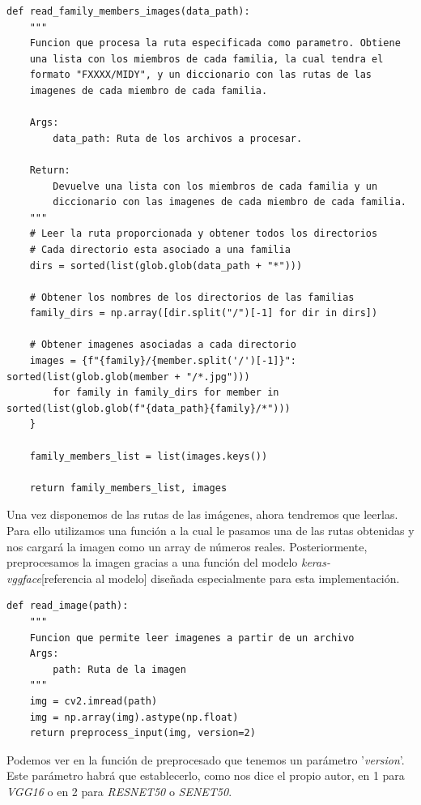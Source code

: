 \documentclass[11pt,a4paper]{article}
\begin{document}
\begin{lstlisting}
def read_family_members_images(data_path):
    """
    Funcion que procesa la ruta especificada como parametro. Obtiene
    una lista con los miembros de cada familia, la cual tendra el
    formato "FXXXX/MIDY", y un diccionario con las rutas de las
    imagenes de cada miembro de cada familia.

    Args:
        data_path: Ruta de los archivos a procesar.
    
    Return:
        Devuelve una lista con los miembros de cada familia y un
        diccionario con las imagenes de cada miembro de cada familia.
    """
    # Leer la ruta proporcionada y obtener todos los directorios
    # Cada directorio esta asociado a una familia
    dirs = sorted(list(glob.glob(data_path + "*")))

    # Obtener los nombres de los directorios de las familias
    family_dirs = np.array([dir.split("/")[-1] for dir in dirs])

    # Obtener imagenes asociadas a cada directorio
    images = {f"{family}/{member.split('/')[-1]}": sorted(list(glob.glob(member + "/*.jpg")))
        for family in family_dirs for member in sorted(list(glob.glob(f"{data_path}{family}/*")))
    }
    
    family_members_list = list(images.keys())
    
    return family_members_list, images
\end{lstlisting}

Una vez disponemos de las rutas de las imágenes, ahora tendremos que leerlas. Para ello utilizamos una función a
la cual le pasamos una de las rutas obtenidas y nos cargará la imagen como un array de números reales. Posteriormente,
preprocesamos la imagen gracias a una función del modelo \textit{keras-vggface}[referencia al modelo] diseñada especialmente
para esta implementación.

\begin{lstlisting}
def read_image(path):
    """
    Funcion que permite leer imagenes a partir de un archivo
    Args:
        path: Ruta de la imagen
    """
    img = cv2.imread(path)
    img = np.array(img).astype(np.float)
    return preprocess_input(img, version=2)
\end{lstlisting}

Podemos ver en la función de preprocesado que tenemos un parámetro '\textit{version}'. Este parámetro habrá que establecerlo,
como nos dice el propio autor, en 1 para \textit{VGG16} o en 2 para \textit{RESNET50} o \textit{SENET50}.
\end{document}
